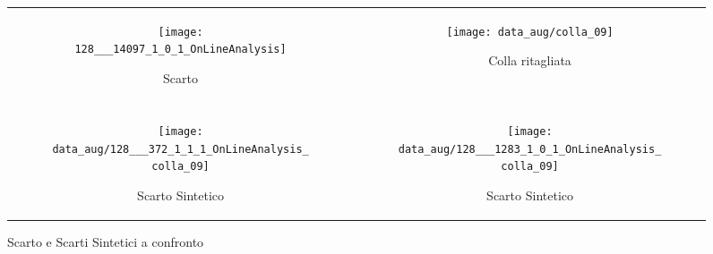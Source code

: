 \begin{figure}[ht] %
  \begin{center}
    \begin{tabular}{cc}
      \begin{subfigure}{.4\linewidth}
        \centering\texttt{[image: 128\_\_\_14097\_1\_0\_1\_OnLineAnalysis]}
        \caption{Scarto}
      \end{subfigure} &

      \begin{subfigure}{.4\linewidth}
        \centering\texttt{[image: data\_aug/colla\_09]}
        \caption{Colla ritagliata}
        \label{fig:ritaglio_colla}
      \end{subfigure} \\ \\

      \begin{subfigure}{.4\linewidth}
        \centering\texttt{[image: data\_aug/128\_\_\_372\_1\_1\_1\_OnLineAnalysis\_colla\_09]}
        \caption{Scarto Sintetico}
        \label{fig:scarto_sintetico_c}
      \end{subfigure} &

      \begin{subfigure}{.4\linewidth}
        \centering\texttt{[image: data\_aug/128\_\_\_1283\_1\_0\_1\_OnLineAnalysis\_colla\_09]}
        \caption{Scarto Sintetico}
        \label{fig:scarto_sintetico_d}
      \end{subfigure}
    \end{tabular}
    \caption{Scarto e Scarti Sintetici a confronto}
    \label{fig:esempi_scarti_sintetici}
  \end{center}
\end{figure}






























